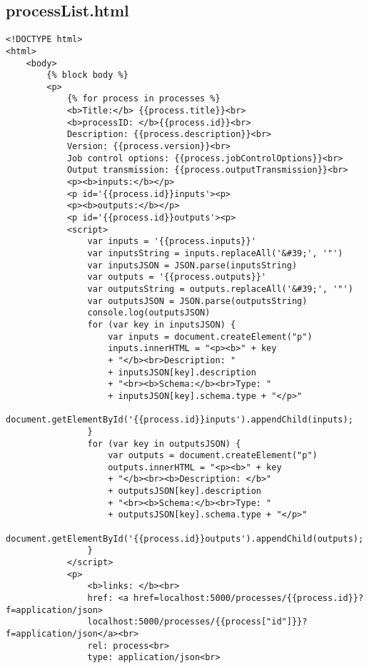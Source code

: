 \subsection{processList.html}
\begin{lstlisting}[caption={processList.html}, style = HTML]
<!DOCTYPE html>
<html>
    <body>
        {% block body %}
        <p>
            {% for process in processes %}
            <b>Title:</b> {{process.title}}<br>
            <b>processID: </b>{{process.id}}<br>
            Description: {{process.description}}<br>
            Version: {{process.version}}<br>
            Job control options: {{process.jobControlOptions}}<br>
            Output transmission: {{process.outputTransmission}}<br>
            <p><b>inputs:</b></p>
            <p id='{{process.id}}inputs'><p>
            <p><b>outputs:</b></p>
            <p id='{{process.id}}outputs'><p>
            <script>
                var inputs = '{{process.inputs}}'
                var inputsString = inputs.replaceAll('&#39;', '"')
                var inputsJSON = JSON.parse(inputsString)
                var outputs = '{{process.outputs}}'
                var outputsString = outputs.replaceAll('&#39;', '"')
                var outputsJSON = JSON.parse(outputsString)
                console.log(outputsJSON)
                for (var key in inputsJSON) {
                    var inputs = document.createElement("p")
                    inputs.innerHTML = "<p><b>" + key 
                    + "</b><br>Description: " 
                    + inputsJSON[key].description 
                    + "<br><b>Schema:</b><br>Type: " 
                    + inputsJSON[key].schema.type + "</p>"
                    document.getElementById('{{process.id}}inputs').appendChild(inputs);
                }
                for (var key in outputsJSON) {
                    var outputs = document.createElement("p")
                    outputs.innerHTML = "<p><b>" + key 
                    + "</b><br><b>Description: </b>" 
                    + outputsJSON[key].description 
                    + "<br><b>Schema:</b><br>Type: " 
                    + outputsJSON[key].schema.type + "</p>"
                    document.getElementById('{{process.id}}outputs').appendChild(outputs);
                }
            </script>
            <p>
                <b>links: </b><br>
                href: <a href=localhost:5000/processes/{{process.id}}?f=application/json>
                localhost:5000/processes/{{process["id"]}}?f=application/json</a><br>
                rel: process<br>
                type: application/json<br>

\end{lstlisting}
